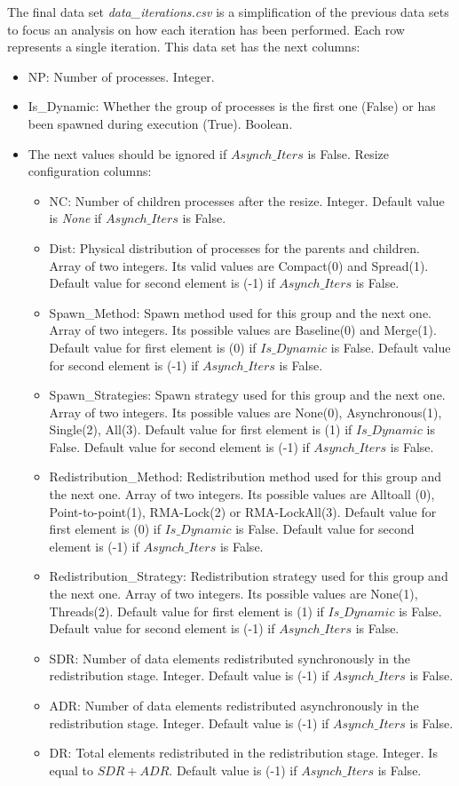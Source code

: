 The final data set \textit{data\_iterations.csv} is a simplification of the previous data sets to focus an analysis on how each iteration has been performed. Each row represents a single iteration.
This data set has the next columns:
\begin{itemize}
    \item NP: Number of processes. Integer.
    \item Is\_Dynamic: Whether the group of processes is the first one (False) or has been spawned during execution (True). Boolean.
    
    \item The next values should be ignored if $Asynch\_Iters$ is False. Resize configuration columns:
    \begin{itemize}
        \item NC: Number of children processes after the resize. Integer. Default value is \textit{None} if $Asynch\_Iters$ is False.
        \item Dist: Physical distribution of processes for the parents and children. Array of two integers. Its valid values are Compact(0) and Spread(1). Default value for second element is (-1) if $Asynch\_Iters$ is False.
        \item Spawn\_Method: Spawn method used for this group and the next one. Array of two integers. Its possible values are Baseline(0) and Merge(1). Default value for first element is (0) if $Is\_Dynamic$ is False. Default value for second element is (-1) if $Asynch\_Iters$ is False.
        \item Spawn\_Strategies: Spawn strategy used for this group and the next one. Array of two integers. Its possible values are None(0), Asynchronous(1), Single(2), All(3). Default value for first element is (1) if $Is\_Dynamic$ is False. Default value for second element is (-1) if $Asynch\_Iters$ is False.
        \item Redistribution\_Method: Redistribution method used for this group and the next one. Array of two integers. Its possible values are Alltoall (0), Point-to-point(1), RMA-Lock(2) or RMA-LockAll(3). Default value for first element is (0) if $Is\_Dynamic$ is False. Default value for second element is (-1) if $Asynch\_Iters$ is False.
        \item Redistribution\_Strategy: Redistribution strategy used for this group and the next one. Array of two integers. Its possible values are None(1), Threads(2). Default value for first element is (1) if $Is\_Dynamic$ is False. Default value for second element is (-1) if $Asynch\_Iters$ is False.
        \item SDR: Number of data elements redistributed synchronously in the redistribution stage. Integer. Default value is (-1) if $Asynch\_Iters$ is False.
        \item ADR: Number of data elements redistributed asynchronously in the redistribution stage. Integer. Default value is (-1) if $Asynch\_Iters$ is False.
        \item DR: Total elements redistributed in the redistribution stage. Integer. Is equal to $SDR + ADR$. Default value is (-1) if $Asynch\_Iters$ is False.
    \end{itemize}
    

\end{itemize}
